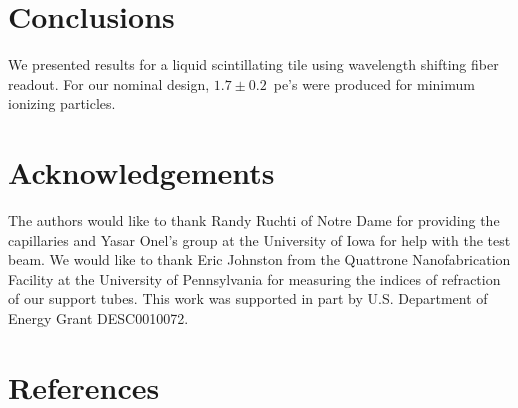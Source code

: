 \documentclass[review]{elsarticle}
\begin{document}
\section{Conclusions}

We presented results for a liquid scintillating tile using wavelength
shifting fiber readout. For our nominal design, $1.7\pm 0.2$~pe's
were produced for minimum ionizing particles.

\section{Acknowledgements}
The authors would like to thank Randy Ruchti of Notre Dame for
providing the capillaries and Yasar Onel's group at the University of
Iowa for help with the test beam. We would like to thank Eric
Johnston from the Quattrone Nanofabrication Facility at the University
of Pennsylvania for measuring the indices of refraction of our support
tubes. This work was supported in part by U.S. Department of Energy
Grant DESC0010072.

\section*{References}


\end{document}
